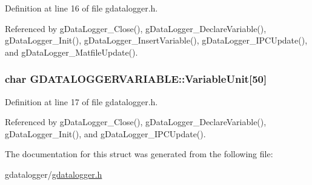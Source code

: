Definition at line 16 of file gdatalogger.\-h.



Referenced by g\-Data\-Logger\-\_\-\-Close(), g\-Data\-Logger\-\_\-\-Declare\-Variable(), g\-Data\-Logger\-\_\-\-Init(), g\-Data\-Logger\-\_\-\-Insert\-Variable(), g\-Data\-Logger\-\_\-\-I\-P\-C\-Update(), and g\-Data\-Logger\-\_\-\-Matfile\-Update().

\hypertarget{structGDATALOGGERVARIABLE_a0d42da63f3f904774cbf2ee8d92ee135}{
\subsubsection[{Variable\-Unit}]{\setlength{\rightskip}{0pt plus 5cm}char G\-D\-A\-T\-A\-L\-O\-G\-G\-E\-R\-V\-A\-R\-I\-A\-B\-L\-E\-::\-Variable\-Unit\mbox{[}50\mbox{]}}}\label{structGDATALOGGERVARIABLE_a0d42da63f3f904774cbf2ee8d92ee135}


Definition at line 17 of file gdatalogger.\-h.



Referenced by g\-Data\-Logger\-\_\-\-Close(), g\-Data\-Logger\-\_\-\-Declare\-Variable(), g\-Data\-Logger\-\_\-\-Init(), and g\-Data\-Logger\-\_\-\-I\-P\-C\-Update().



The documentation for this struct was generated from the following file\-:\begin{DoxyCompactItemize}
\item 
gdatalogger/\hyperlink{gdatalogger_8h}{gdatalogger.\-h}\end{DoxyCompactItemize}
